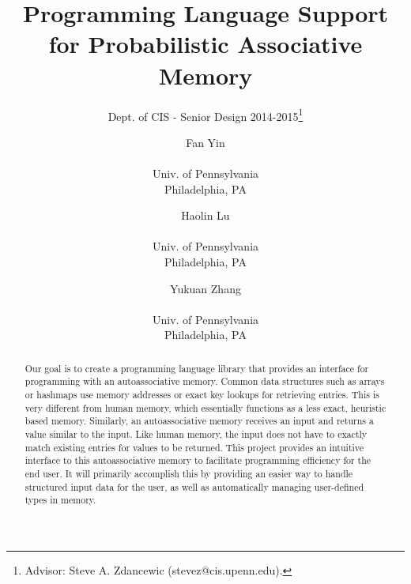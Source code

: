 \documentclass{sig-alternate}
\begin{document}
 

\title{Programming Language Support for Probabilistic Associative Memory}
\subtitle{Dept. of CIS - Senior Design 2014-2015\thanks{Advisor: Steve A. Zdancewic (stevez@cis.upenn.edu).}}
\author{
    Fan Yin \\  \\Univ. of Pennsylvania \\ Philadelphia, PA
    \and Haolin Lu \\  \\Univ. of Pennsylvania \\ Philadelphia, PA
    \and Yukuan Zhang\\  \\Univ. of Pennsylvania \\ Philadelphia, PA
}
%
%
\date{}
\maketitle


\begin{abstract}
    Our goal is to create a programming language library that provides an interface
    for programming with an autoassociative memory. Common data structures such as 
    arrays or hashmaps use memory addresses or exact key lookups for retrieving entries.
    This is very different from human memory, which essentially functions as a less exact, heuristic
    based memory. Similarly, an autoassociative memory receives an input and returns a value similar to the input. Like human memory, the input does not have to exactly match existing entries
    for values to be returned. This project provides an intuitive interface to this autoassociative memory to facilitate programming efficiency for the end user. It will primarily
    accomplish this by providing an easier way to handle structured input data for the user, as well
    as automatically managing user-defined types in memory.
\end{abstract}
\end{document}
